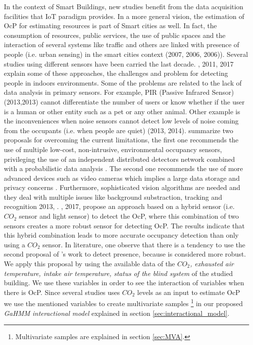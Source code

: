 In the context of Smart Buildings, new studies benefit from the data acquisition facilities that IoT paradigm provides. In a more general vision, the estimation of OcP for estimating resources is part of Smart cities as well. In fact, the consumption of resources, public services, the use of public spaces and the interaction of several systems like traffic and others are linked with presence of people (i.e. urban sensing) in the smart cities context (2007, 2006, 2006)\cite{abdelzaher2007mobiscopes, burke2006participatory, campbell2006people}). Several studies using different sensors have been carried the last decade. \citeauthor{benezeth2011towards,huang2017occupancy}, 2011, 2017 \cite{benezeth2011towards, huang2017occupancy} explain some of these approaches, the challenges and problem for detecting people in indoors environments. Some of the problems are related to the lack of data analysis in primary sensors. For example, PIR (Passive Infrared Sensor) (2013,2013) \cite{duarte2013revealing,nguyen2013energy} cannot differentiate the number of users or know whether if the user is a human or other entity such as a pet or any other animal. Other example is the inconveniences when noise sensors cannot detect low levels of noise coming from the occupants (i.e. when people are quiet) (2013, 2014)\cite{uziel2013networked,kelly2014application}. \citeauthor{benezeth2011towards,huang2017occupancy} summarize two proposals for overcoming the current limitations, the first one recommends the use of multiple low-cost, non-intrusive, environmental occupancy sensors, privileging the use of an independent distributed detectors network combined with a probabilistic data analysis \cite{benezeth2011towards,huang2017occupancy}. The second one recommends the use of more advanced devices such as video cameras which implies a large data storage and privacy concerns  \cite{benezeth2011towards}. Furthermore, sophisticated vision algorithms are needed and they deal with multiple issues like background substraction, tracking and recognition 2013, \cite{sid2013detection}. \citeauthor{huang2017occupancy}, 2017, \cite{huang2017occupancy} propose an approach based on a hybrid sensor (i.e. $CO_2$ sensor and light sensor) to detect the OcP, where this combination of two sensors creates a more robust sensor for detecting OcP. The results indicate that this hybrid combination leads to 
more accurate occupancy detection than only using a $CO_2$ sensor. In literature, one observe that there is a tendency to use the second proposal of \citeauthor{benezeth2011towards}'s work to detect presence, because is considered more robust. We apply this proposal by using the available data of the \textit{$CO_2$, exhausted air temperature, intake air temperature, status of the blind system} of the studied building. We use these variables in order to see the interaction of variables when there is OcP. Since several studies uses $CO_2$ levels as an input to estimate OcP \cite{huang2017occupancy,labeodan2015occupancy,nassif2012} we use the mentioned variables to create multivariate samples \footnote{Multivariate samples are explained in section \ref{sec:MVA}.} in our proposed \textit{GaHMM interactional model} explained in section \ref{sec:interactional_model}. 


